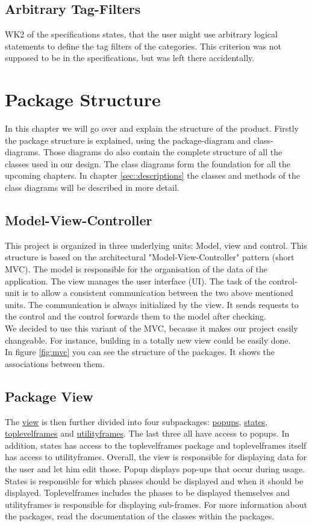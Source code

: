 \documentclass[parskip=full]{report} %
\begin{document}
\section*{Arbitrary Tag-Filters}
WK2 of the specifications states, that the user might use arbitrary logical statements to define the tag filters of the categories. This criterion was not supposed to be in the specifications, but was left there accidentally.



\chapter{Package Structure}
In this chapter we will go over and explain the structure of the product. Firstly the package structure is explained, using the  package-diagram and class-diagrams. Those diagrams do also contain the complete structure of all the classes used in our design. The class diagrams form the foundation for all the upcoming chapters. In chapter \ref{sec::descriptions} the classes and methods of the class diagrams will be described in more detail.

\section{Model-View-Controller} \label{sec::mvc}
This project is organized in three underlying units: Model, view and control. This structure is based on the architectural "Model-View-Controller" pattern (short MVC). 
The model is responsible for the organisation of the data of the application. The view manages the user interface (UI). The task of the control-unit is to allow a consistent communication between the two above mentioned units. The communication is always initialized by the view. It sends requests to the control and the control forwards them to the model after checking.\\
We decided to use this variant of the MVC, because it makes our project easily changeable. For instance, building in a totally new view could be easily done.\\
In figure \ref{fig:mvc} you can see the structure of the packages. It shows the associations between them.


\section{Package View}
The \hyperref[fig:view]{view} is then further divided into four subpackages: \hyperref[fig:popups]{popups}, \hyperref[fig:states]{states}, \hyperref[fig:toplevelframes]{toplevelframes} and \hyperref[fig:utilityframes]{utilityframes}. The last three all have access to popups. In addition, states has access to the toplevelframes package and toplevelframes itself has access to utilityframes. Overall, the view is responsible for displaying data for the user and let him edit those. Popup displays pop-ups that occur during usage. States is responsible for which phases should be displayed and when it should be displayed. Toplevelframes includes the phases to be displayed themselves and utilityframes is responsible for displaying sub-frames. For more information about the packages, read the documentation of the classes within the packages.
\end{document}
